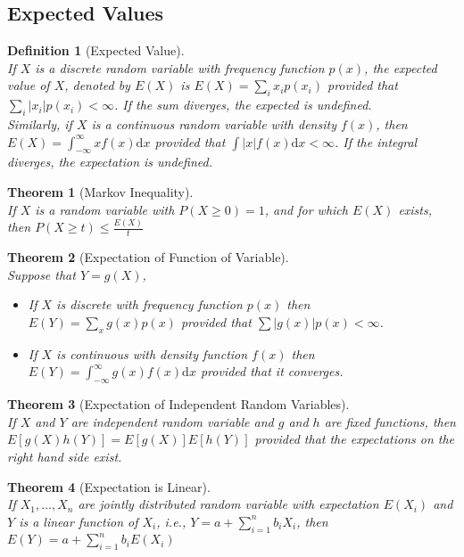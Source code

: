 \documentclass[12pt]{article}
\newcommand{\diff}{\mathrm{d}}
\newtheorem{definition}{Definition}[section]
\newtheorem{theorem}{Theorem}[section]
\theoremstyle{definition}
\begin{document}
\subsection{Expected Values}
\begin{definition}[Expected Value]
\hfill\\\normalfont If $X$ is a discrete random variable with frequency function $p(x)$, the expected value of $X$, denoted by $E(X)$ is
$
E(X) = \sum_i x_ip(x_i)
$
provided that $\sum_i |x_i|p(x_i)<\infty$. If the sum diverges, the expected is undefined.\\
Similarly, if $X$ is a continuous random variable with density $f(x)$, then
$
E(X) = \int_{-\infty}^\infty xf(x)\diff x
$
provided that $\int |x|f(x)\diff x<\infty$. If the integral diverges, the expectation is undefined.
\end{definition}
\begin{theorem}[Markov Inequality]
\hfill\\\normalfont If $X$ is a random variable with $P(X\geq 0)=1$, and for which $E(X)$ exists, then 
$
P(X\geq t) \leq \frac{E(X)}{t}
$
\end{theorem}
\begin{theorem}[Expectation of Function of Variable]
\hfill\\\normalfont Suppose that $Y=g(X)$,
\begin{itemize}
  \item If $X$ is discrete with frequency function $p(x)$ then $E(Y) = \sum_{x}g(x)p(x)$ provided that $\sum|g(x)|p(x)<\infty$.
  \item If $X$ is continuous with density function $f(x)$ then $E(Y) = \int_{-\infty}^\infty g(x)f(x)\diff x$  provided that it converges.
\end{itemize}
\end{theorem}
\begin{theorem}[Expectation of Independent Random Variables]
\hfill\\\normalfont If $X$ and $Y$ are independent random variable and $g$ and $h$ are fixed functions, then 
$
E[g(X)h(Y)] = E[g(X)]E[h(Y)]
$
provided that the expectations on the right hand side exist.
\end{theorem}
\begin{theorem}[Expectation is Linear]
\hfill\\\normalfont If $X_1,\ldots,X_n$ are jointly distributed random variable with expectation $E(X_i)$ and $Y$ is a linear function of $X_i$, i.e., $Y=a+\sum_{i=1}^n b_iX_i$, then
$
E(Y) = a+\sum_{i=1}^n b_iE(X_i)
$
\end{theorem}
\end{document}
